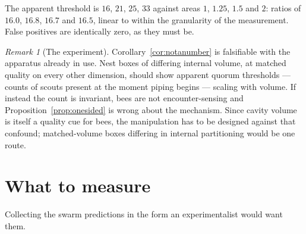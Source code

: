 \documentclass[11pt,a4paper]{article}
\theoremstyle{plain}
\theoremstyle{definition}
\theoremstyle{remark}
\newtheorem{remark}[theorem]{Remark}
\begin{document}
The apparent threshold is $16$, $21$, $25$, $33$ against areas $1$, $1.25$,
$1.5$ and $2$: ratios of $16.0$, $16.8$, $16.7$ and $16.5$, linear to within
the granularity of the measurement. False positives are identically zero, as
they must be.

\begin{remark}[The experiment]\label{rem:experiment}
Corollary~\ref{cor:notanumber} is falsifiable with the apparatus already in
use. Nest boxes of differing internal volume, at matched quality on every other
dimension, should show apparent quorum thresholds --- counts of scouts present
at the moment piping begins --- scaling with volume. If instead the count is
invariant, bees are not encounter-sensing and Proposition~\ref{prop:onesided}
is wrong about the mechanism. Since cavity volume is itself a quality cue for
bees, the manipulation has to be designed against that confound; matched-volume
boxes differing in internal partitioning would be one route.
\end{remark}

\section{What to measure}\label{sec:protocol}

Collecting the swarm predictions in the form an experimentalist would want
them.
\end{document}
